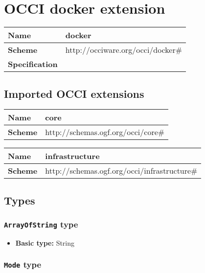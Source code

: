 \section{OCCI docker extension}
\begin{center}
\begin{tabular}{|l|l|}
  \hline
  \textbf{Name} & docker \\
  \hline  
  \textbf{Scheme} & http://occiware.org/occi/docker\# \\
  \hline
  \textbf{Specification} &  \\
  \hline
\end{tabular}
\end{center}

\subsection{Imported OCCI extensions}

\begin{center} 
\begin{tabular}{|l|l|}
  \hline
  \textbf{Name} & core \\
  \hline  
  \textbf{Scheme} & http://schemas.ogf.org/occi/core\# \\
  \hline
\end{tabular}
\end{center}
\begin{center} 
\begin{tabular}{|l|l|}
  \hline
  \textbf{Name} & infrastructure \\
  \hline  
  \textbf{Scheme} & http://schemas.ogf.org/occi/infrastructure\# \\
  \hline
\end{tabular}
\end{center}


\subsection{Types}
\subsubsection{\texttt{ArrayOfString} type}

\begin{itemize}
\item \textbf{Basic type:} String
\end{itemize}
\subsubsection{\texttt{Mode} type}


